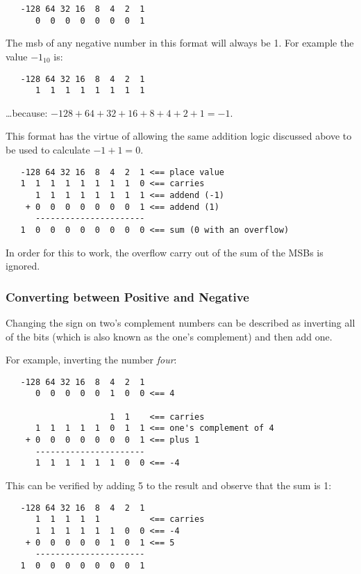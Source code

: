 \begin{verbatim}
   -128 64 32 16  8  4  2  1
      0  0  0  0  0  0  0  1
\end{verbatim}

The \acrshort{msb} of any negative number in this format will always
be 1.  For example the value $-1_{10}$ is:

\begin{verbatim}
   -128 64 32 16  8  4  2  1
      1  1  1  1  1  1  1  1
\end{verbatim}

\ldots because: $-128+64+32+16+8+4+2+1=-1$.

This format has the virtue of allowing the same addition logic 
discussed above to be used to calculate $-1+1=0$.

\begin{verbatim}
   -128 64 32 16  8  4  2  1 <== place value
   1  1  1  1  1  1  1  1  0 <== carries
      1  1  1  1  1  1  1  1 <== addend (-1)
    + 0  0  0  0  0  0  0  1 <== addend (1)
      ----------------------
   1  0  0  0  0  0  0  0  0 <== sum (0 with an overflow)
\end{verbatim}

In order for this to work, the \gls{overflow} carry out of the 
sum of the MSBs is ignored.

\subsubsection{Converting between Positive and Negative}

Changing the sign on two's complement numbers can be described as
inverting all of the bits (which is also known as the one's complement)
and then add one.

For example, inverting the number {\em four}:

\begin{verbatim}
   -128 64 32 16  8  4  2  1
      0  0  0  0  0  1  0  0 <== 4

                     1  1    <== carries
      1  1  1  1  1  0  1  1 <== one's complement of 4
    + 0  0  0  0  0  0  0  1 <== plus 1
      ----------------------
      1  1  1  1  1  1  0  0 <== -4
\end{verbatim}

This can be verified by adding 5 to the result and observe that
the sum is 1:

\begin{verbatim}
   -128 64 32 16  8  4  2  1
      1  1  1  1  1          <== carries
      1  1  1  1  1  1  0  0 <== -4
    + 0  0  0  0  0  1  0  1 <== 5
      ----------------------
   1  0  0  0  0  0  0  0  1
\end{verbatim}

